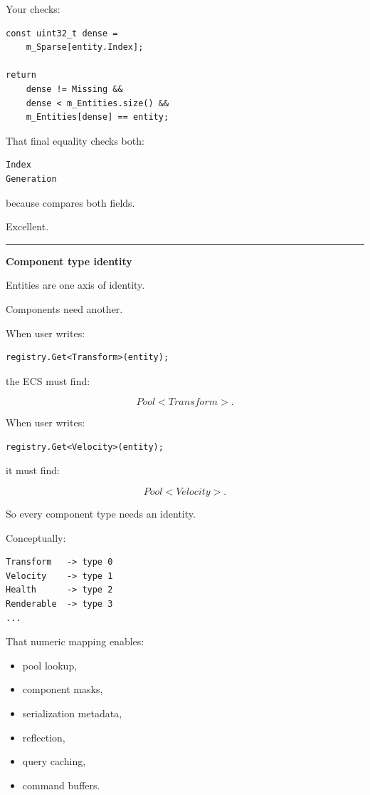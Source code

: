 Your  checks:

\begin{verbatim}
const uint32_t dense =
    m_Sparse[entity.Index];

return
    dense != Missing &&
    dense < m_Entities.size() &&
    m_Entities[dense] == entity;
\end{verbatim}

That final equality checks both:

\begin{verbatim}
Index
Generation
\end{verbatim}

because  compares both fields.

Excellent.

\begin{center}\rule{0.5\linewidth}{0.5pt}\end{center}

\textbf{Component type identity}

Entities are one axis of identity.

Components need another.

When user writes:

\begin{verbatim}
registry.Get<Transform>(entity);
\end{verbatim}

the ECS must find:

\[
Pool<Transform>.
\]

When user writes:

\begin{verbatim}
registry.Get<Velocity>(entity);
\end{verbatim}

it must find:

\[
Pool<Velocity>.
\]

So every component type needs an identity.

Conceptually:

\begin{verbatim}
Transform   -> type 0
Velocity    -> type 1
Health      -> type 2
Renderable  -> type 3
...
\end{verbatim}

That numeric mapping enables:

\begin{itemize}
\tightlist
\item
  pool lookup,
\item
  component masks,
\item
  serialization metadata,
\item
  reflection,
\item
  query caching,
\item
  command buffers.
\end{itemize}

